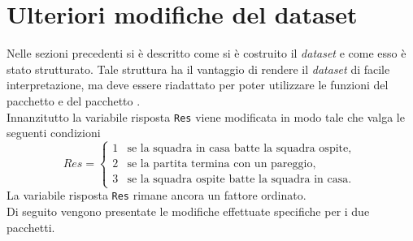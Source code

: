 \begin{comment}
	
	
	\section{Ulteriori modifiche del dataset}
	
	Nelle sezioni precedenti si è descritto come si è costruito il dataset e come esso è stato strutturato. Tale struttura ha il vantaggio di rendere il dataset di facile interpretazione, ma deve essere riadattato per poter utilizzare le funzioni del pacchetto \texttt{BradleyTerry2}.\\ 
	Sono state apportare le seguenti modifiche.\\
	
	Innanzitutto il modello richiede che le due variabili \texttt{Team} e \texttt{Vs} siano di tipo fattore oppure costituiscano un \textsf{data.frame}. Un \textsf{data.frame} è una raccolta di vettori di osservazioni, che devono avere tutti la stessa lunghezza, ma possono essere di tipo diverso: variabili nominali (fattori) o variabili numeriche.
	Le variabili \textsf{Team} e \textsf{Vs} sono state trasformate in \texttt{data.frame} in modo da poter inserire al loro interno tutte le covariate descritte nella sezione precedente.
	
	Inoltre i valori della variabile \texttt{AtHome} sono stati converti in 1 (se \texttt{TRUE}) mentre in 0 (se \texttt{FALSE}).
	
\end{comment}
\pagebreak
\section{Ulteriori modifiche del dataset}

Nelle sezioni precedenti si è descritto come si è costruito il \emph{dataset} e come esso è stato strutturato. Tale struttura ha il vantaggio di rendere il \emph{dataset} di facile interpretazione, ma deve essere riadattato per poter utilizzare le funzioni del pacchetto \textit{\cite{bt2}} e del pacchetto \textit{\cite{btl}}.\\ 
Innanzitutto la variabile risposta \texttt{Res} viene modificata in modo tale che valga le seguenti condizioni
\begin{equation}
	Res =
	\begin{cases}
		1 & \text{se la squadra in casa batte la squadra ospite,}\\
		2 & \text{se la partita termina con un pareggio,}\\
		3 & \text{se la squadra ospite batte la squadra in casa. }
	\end{cases}       
\end{equation}
La variabile risposta \texttt{Res} rimane ancora un fattore ordinato.\\
Di seguito vengono presentate le modifiche effettuate specifiche per i due pacchetti.
